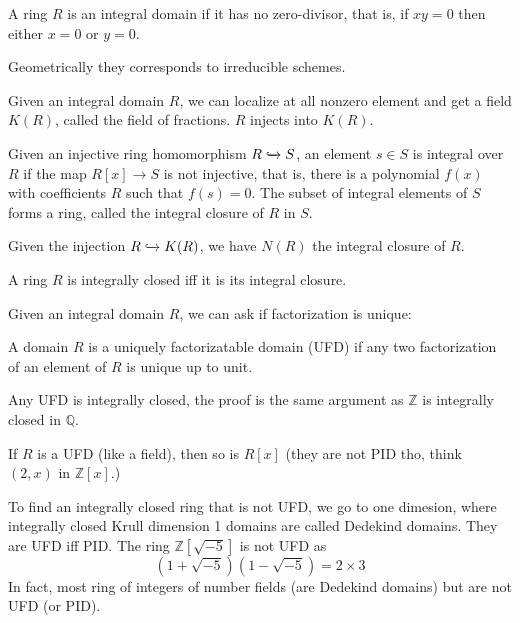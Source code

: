 \documentclass[main.tex]{subfiles}
\begin{document}
\begin{definition}
A ring $R$ is an integral domain if it has no zero-divisor, that is, if $xy = 0$ then either $x = 0$ or $y = 0$.
\end{definition}

Geometrically they corresponds to irreducible schemes.

\begin{remark}
Given an integral domain $R$, we can localize at all nonzero element and get a field $K(R)$, called the field of fractions. $R$ injects into $K(R)$.
\end{remark}

\begin{definition}
Given an injective ring homomorphism $R \xhookrightarrow{} S$, an element $s \in S$ is integral over $R$ if the map $R[x] \rightarrow S$ is not injective, that is, there is a polynomial $f(x)$ with coefficients $R$ such that $f(s) = 0$. The subset of integral elements of $S$ forms a ring, called the integral closure of $R$ in $S$.
\end{definition}

Given the injection $R \xhookrightarrow{} K(R)$, we have $N(R)$ the integral closure of $R$.

\begin{definition}
A ring $R$ is integrally closed iff it is its integral closure.
\end{definition}

Given an integral domain $R$, we can ask if factorization is unique:

\begin{definition}
A domain $R$ is a uniquely factorizatable domain (UFD) if any two factorization of an element of $R$ is unique up to unit.
\end{definition}

\begin{lemma}
Any UFD is integrally closed, the proof is the same argument as $\mathbb{Z}$ is integrally closed in $\mathbb{Q}$.
\end{lemma}

\begin{example}
If $R$ is a UFD (like a field), then so is $R[x]$ (they are not PID tho, think $(2, x)$ in $\mathbb{Z}[x]$.)

To find an integrally closed ring that is not UFD, we go to one dimesion, where integrally closed Krull dimension 1 domains are called Dedekind domains. They are UFD iff PID. The ring $\mathbb{Z}[\sqrt{-5}]$ is not UFD as 
$$
(1 + \sqrt{-5}) (1 - \sqrt{-5}) = 2 \times 3
$$
In fact, most ring of integers of number fields (are Dedekind domains) but are not UFD (or PID).
\end{example}
\end{document}
